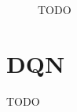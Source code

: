 \begin{figure}[ht]
\begin{subfigure}[b]{0.45\textwidth}
        \label{fig:breakout_weights2}
    \end{subfigure}

    \caption{TODO}
    \label{fig:breakout_attention}
\end{figure}







\section{DQN}\label{sec:dqn}
TODO






\\
\\




